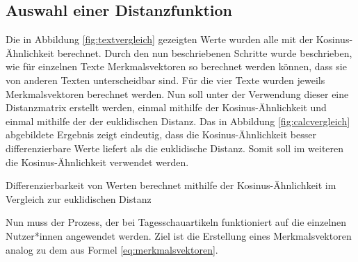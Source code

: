 \subsection{Auswahl einer Distanzfunktion}
Die in Abbildung \ref{fig:textvergleich} gezeigten Werte wurden alle mit der Kosinus-Ähnlichkeit berechnet. Durch den nun beschriebenen Schritte wurde beschrieben, wie für einzelnen Texte Merkmalsvektoren so berechnet werden können, dass sie von anderen Texten unterscheidbar sind. Für die vier Texte wurden jeweils Merkmalsvektoren berechnet werden. Nun soll unter der Verwendung dieser eine Distanzmatrix erstellt werden, einmal mithilfe der Kosinus-Ähnlichkeit und einmal mithilfe der der euklidischen Distanz. Das in Abbildung \ref{fig:calcvergleich} abgebildete Ergebnis zeigt eindeutig, dass die Kosinus-Ähnlichkeit besser differenzierbare Werte liefert als die euklidische Distanz. Somit soll im weiteren die Kosinus-Ähnlichkeit verwendet werden.
\begin{table}
	\centering
	
	
	\caption{Differenzierbarkeit von Werten berechnet mithilfe der Kosinus-Ähnlichkeit im Vergleich zur euklidischen Distanz}
	\label{fig:calcvergleich}
\end{table}
Nun muss der Prozess, der bei Tagesschauartikeln funktioniert auf die einzelnen Nutzer*innen angewendet werden. Ziel ist die Erstellung eines Merkmalsvektoren analog zu dem aus Formel \ref{eq:merkmalsvektoren}. 
